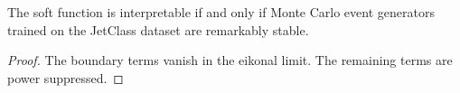 \begin{proposition}\label{thm:1}
The soft function is interpretable if and only if Monte Carlo event
generators trained on the JetClass dataset are remarkably stable.
\end{proposition}

\begin{proof}
The boundary terms vanish in the eikonal limit. The remaining terms are
power suppressed.
\end{proof}

